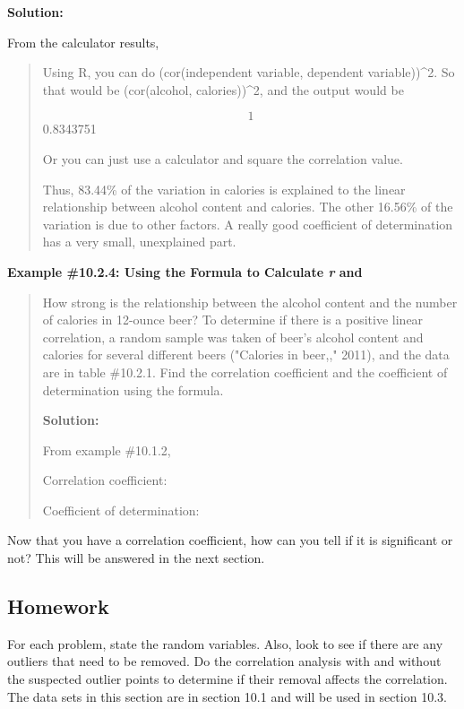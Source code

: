 \documentclass[]{book}
\begin{document}
\textbf{Solution:}

From the calculator results,

\begin{quote}
Using R, you can do (cor(independent variable, dependent variable))\^{}2. So that would be (cor(alcohol, calories))\^{}2, and the output would be

\[1\] 0.8343751

Or you can just use a calculator and square the correlation value.

Thus, 83.44\% of the variation in calories is explained to the linear relationship between alcohol content and calories. The other 16.56\% of the variation is due to other factors. A really good coefficient of determination has a very small, unexplained part.
\end{quote}

\textbf{Example \#10.2.4: Using the Formula to Calculate \emph{r} and }

\begin{quote}
How strong is the relationship between the alcohol content and the number of calories in 12-ounce beer? To determine if there is a positive linear correlation, a random sample was taken of beer's alcohol content and calories for several different beers ("Calories in beer,," 2011), and the data are in table \#10.2.1. Find the correlation coefficient and the coefficient of determination using the formula.

\textbf{Solution:}

From example \#10.1.2,

Correlation coefficient:

Coefficient of determination:
\end{quote}

Now that you have a correlation coefficient, how can you tell if it is significant or not? This will be answered in the next section.

\hypertarget{homework-30}{%
\subsection{Homework}\label{homework-30}}

For each problem, state the random variables. Also, look to see if there are any outliers that need to be removed. Do the correlation analysis with and without the suspected outlier points to determine if their removal affects the correlation. The data sets in this section are in section 10.1 and will be used in section 10.3.
\end{document}
